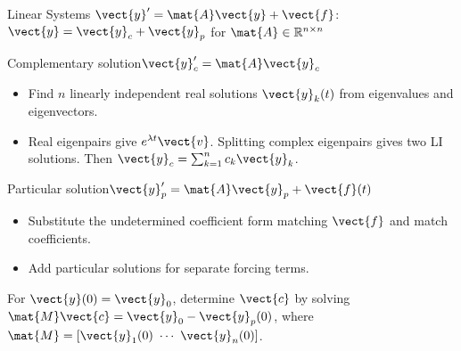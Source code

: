 \documentclass[11pt,aspectratio=169]{beamer}
\begin{document}
\begin{frame}{Linear Systems $\vect{y}'=\mat{A}\vect{y}+\vect{f}$: \quad $\vect{y}=\vect{y}_c+\vect{y}_p$
		for $\mat{A}\in\mathbb{R}^{n\times n}$}
\begin{block}{Complementary solution\quad $\vect{y}_c'=\mat{A}\vect{y}_c$}
\begin{itemize}
  \item Find $n$ linearly independent real solutions $\vect{y}_k(t)$ from eigenvalues and eigenvectors.
  \item Real eigenpairs give $e^{\lambda t}\vect{v}$. Splitting complex eigenpairs gives two LI solutions.
  Then $\vect{y}_c=\sum_{k=1}^{n}c_k\vect{y}_k$.
\end{itemize}
\end{block}
\begin{block}{Particular solution\quad $\vect{y}_p'=\mat{A}\vect{y}_p+\vect{f}(t)$}
\begin{itemize}
  \item Substitute the undetermined coefficient 
  form matching $\vect{f}$ and match coefficients.
  \item Add particular solutions for separate forcing terms.
\end{itemize}
\end{block}
For $\vect{y}(0)=\vect{y}_0$, determine $\vect{c}$ by solving
$\mat{M}\vect{c}=\vect{y}_0-\vect{y}_p(0)$,
where $\mat{M}=[\vect{y}_1(0)\ \cdots\ \vect{y}_n(0)]$.
\end{frame}
\end{document}
